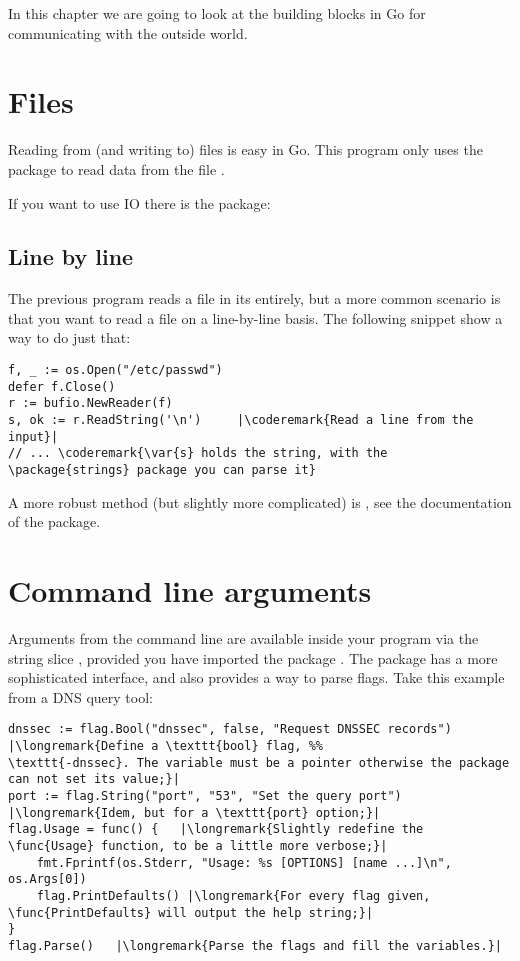 \noindent{}In this chapter we are going to look at the building blocks in Go for 
communicating with the outside world.

\section{Files}
Reading from (and writing to) files is easy in Go. This program
only uses the  package to read data from the file .

\showremarks
If you want to use  IO there is the
 package:

\showremarks

\subsection{Line by line}
The previous program reads a file in its entirely, but a more common scenario is that
you want to read a file on a line-by-line basis. The following snippet show a way
to do just that:

\begin{lstlisting}
f, _ := os.Open("/etc/passwd")
defer f.Close()
r := bufio.NewReader(f)
s, ok := r.ReadString('\n')     |\coderemark{Read a line from the input}|
// ... \coderemark{\var{s} holds the string, with the \package{strings} package you can parse it}
\end{lstlisting}

A more robust method (but slightly more complicated) is , see the documentation
of the  package.

\section{Command line arguments}
\label{sec:option parsing}
Arguments from the command line are available inside your program via
the string slice , provided you have imported the package
. The  package has a more sophisticated
interface, and also provides a way to parse flags. Take this example
from a DNS query tool:
\begin{lstlisting}
dnssec := flag.Bool("dnssec", false, "Request DNSSEC records") |\longremark{Define a \texttt{bool} flag, %%
\texttt{-dnssec}. The variable must be a pointer otherwise the package can not set its value;}|
port := flag.String("port", "53", "Set the query port")      |\longremark{Idem, but for a \texttt{port} option;}|
flag.Usage = func() {   |\longremark{Slightly redefine the \func{Usage} function, to be a little more verbose;}|
    fmt.Fprintf(os.Stderr, "Usage: %s [OPTIONS] [name ...]\n", os.Args[0])
    flag.PrintDefaults() |\longremark{For every flag given, \func{PrintDefaults} will output the help string;}|
}
flag.Parse()   |\longremark{Parse the flags and fill the variables.}|
\end{lstlisting}
\showremarks

